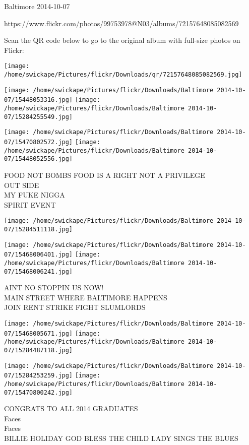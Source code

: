 \documentclass[10pt,letterpaper]{article}
\begin{document}
Baltimore 2014-10-07

https://www.flickr.com/photos/99753978@N03/albums/72157648085082569

Scan the QR code below to go to the original album with full-size photos on Flickr:

\texttt{[image: /home/swickape/Pictures/flickr/Downloads/qr/72157648085082569.jpg]}
\pagebreak

\texttt{[image: /home/swickape/Pictures/flickr/Downloads/Baltimore 2014-10-07/15448053316.jpg]}
\texttt{[image: /home/swickape/Pictures/flickr/Downloads/Baltimore 2014-10-07/15284255549.jpg]}

\texttt{[image: /home/swickape/Pictures/flickr/Downloads/Baltimore 2014-10-07/15470802572.jpg]}
\texttt{[image: /home/swickape/Pictures/flickr/Downloads/Baltimore 2014-10-07/15448052556.jpg]}

FOOD NOT BOMBS FOOD IS A RIGHT NOT A PRIVILEGE\\
OUT SIDE\\
MY FUKE NIGGA\\
SPIRIT EVENT
\pagebreak

\texttt{[image: /home/swickape/Pictures/flickr/Downloads/Baltimore 2014-10-07/15284511118.jpg]}

\vspace{0.25in}
\texttt{[image: /home/swickape/Pictures/flickr/Downloads/Baltimore 2014-10-07/15468006401.jpg]}
\texttt{[image: /home/swickape/Pictures/flickr/Downloads/Baltimore 2014-10-07/15468006241.jpg]}

AINT NO STOPPIN US NOW!\\
MAIN STREET WHERE BALTIMORE HAPPENS\\
JOIN RENT STRIKE FIGHT SLUMLORDS
\pagebreak

\texttt{[image: /home/swickape/Pictures/flickr/Downloads/Baltimore 2014-10-07/15468005671.jpg]}
\texttt{[image: /home/swickape/Pictures/flickr/Downloads/Baltimore 2014-10-07/15284487118.jpg]}

\texttt{[image: /home/swickape/Pictures/flickr/Downloads/Baltimore 2014-10-07/15284253259.jpg]}
\texttt{[image: /home/swickape/Pictures/flickr/Downloads/Baltimore 2014-10-07/15470800242.jpg]}

CONGRATS TO ALL 2014 GRADUATES\\
Faces\\
Faces\\
BILLIE HOLIDAY GOD BLESS THE CHILD LADY SINGS THE BLUES
\pagebreak
\end{document}
